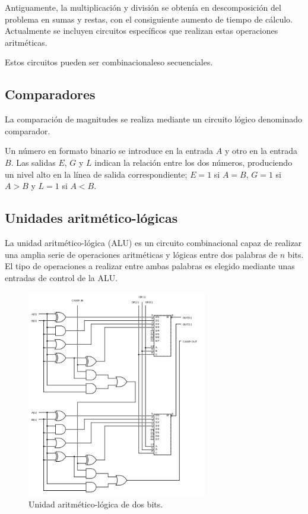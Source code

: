 \documentclass[a4paper, 11pt, titlepage]{article}
\begin{document}
			Antiguamente, la multiplicación y división se obtenía en descomposición del problema en 
			sumas y restas, con el consiguiente aumento de tiempo de cálculo. Actualmente se incluyen 
			circuitos específicos que realizan estas operaciones aritméticas. 
			
			Estos circuitos pueden ser combinacionaleso secuenciales.

	\subsection{Comparadores}

		La comparación de magnitudes se realiza mediante un circuito lógico denominado comparador.

		Un número en formato binario se introduce en la entrada $A$ y otro en la entrada $B$. Las salidas 
		$E$, $G$ y $L$ indican la relación entre los dos números, produciendo un nivel alto en la línea 
		de salida correspondiente; $E = 1$ si $A = B$, $G = 1$ si $A > B$ y $L = 1$ si $A < B$. 

	\subsection{Unidades aritmético-lógicas}

		La unidad aritmético-lógica (ALU) es un circuito combinacional capaz de realizar una amplia serie de 
		operaciones aritméticas y lógicas entre dos palabras de $n$ bits. El tipo de operaciones a realizar 
		entre ambas palabras es elegido mediante unas entradas de control de la ALU.

		\begin{figure}[htp]
			\centering
			\includegraphics[width=0.7\textwidth]{resources/alu2bits.png}
			\caption{Unidad aritmético-lógica de dos bits.}
			\label{alu2bits}
		\end{figure}
\end{document}
